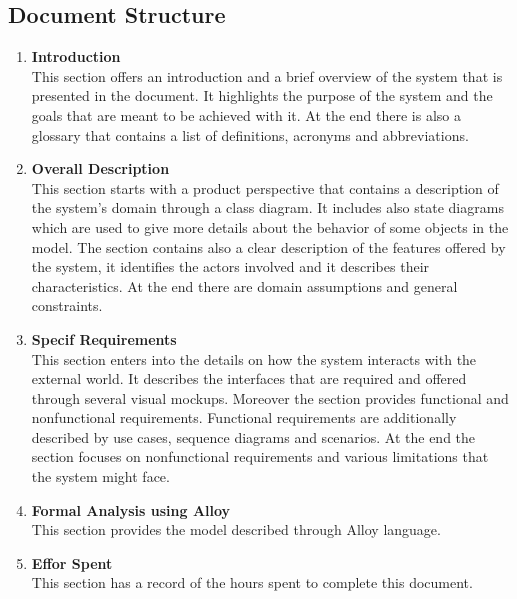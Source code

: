 \subsection{Document Structure}
\begin{enumerate}
    \item \textbf{Introduction}\\
            This section offers an introduction and a brief overview of the system that is presented in the document. 
            It highlights the purpose of the system and the goals that are meant to be achieved with it. 
            At the end there is also a glossary that contains a list of definitions, acronyms and abbreviations.
            
    \item \textbf{Overall Description}\\
            This section starts with a product perspective that contains a description of the system's domain through a class diagram. 
            It includes also state diagrams which are used to give more details about the behavior of some objects in the model.
            The section contains also a clear description of the features offered by the system, 
            it identifies the actors involved and it describes their characteristics.
            At the end there are domain assumptions and general constraints.
            
    
    \item \textbf{Specif Requirements}\\
            This section enters into the details on how the system interacts with the external world. It describes 
            the interfaces that are required and offered through several visual mockups. 
            Moreover the section provides functional and nonfunctional requirements. Functional
            requirements are additionally described by use cases, sequence diagrams and scenarios.
            At the end the section focuses on nonfunctional requirements and various limitations that the system might face.

    \item \textbf{Formal Analysis using Alloy}\\
            This section provides the model described through Alloy language.
            
    \item \textbf{Effor Spent}\\
            This section has a record of the hours spent to complete this document.

\end{enumerate}


